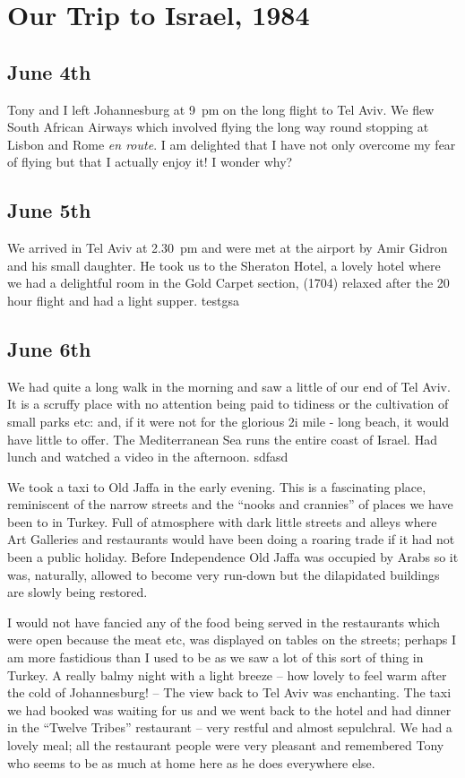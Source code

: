 \chapter{Our Trip to Israel, 1984}\label{Israel}


\section{June 4th}

Tony and I left Johannesburg at 9~pm on the long flight to Tel
Aviv. We flew South African Airways which involved flying the long way
round stopping at Lisbon and Rome \textit{en route}. I am delighted
that I have not only overcome my fear of flying but that I actually
enjoy it! I wonder why?

\section{June 5th}

We arrived in Tel Aviv at 2.30~pm and were met at the airport by Amir
Gidron and his small daughter.  He took us to the Sheraton Hotel, a
lovely hotel where we had a delightful room in the Gold Carpet
section, (1704) relaxed after the 20 hour flight and had a light
supper. testgsa

\section{June 6th}

We had quite a long walk in the morning and saw a little of our end of
Tel Aviv. It is a scruffy place with no attention being paid to
tidiness or the cultivation of small parks etc: and, if it were not
for the glorious 2i mile - long beach, it would have little to
offer. The Mediterranean Sea runs the entire coast of Israel. Had
lunch and watched a video in the afternoon. sdfasd

We took a taxi to Old Jaffa in the early evening. This is a
fascinating place, reminiscent of the narrow streets and the ``nooks
and crannies'' of places we have been to in Turkey. Full of atmosphere
with dark little streets and alleys where Art Galleries and
restaurants would have been doing a roaring trade if it had not been a
public holiday. Before Independence Old Jaffa was occupied by Arabs so
it was, naturally, allowed to become very run-down but the dilapidated
buildings are slowly being restored.

I would not have fancied any of the food being served in the
restaurants which were open because the meat etc, was displayed on
tables on the streets; perhaps I am more fastidious than I used to be
as we saw a lot of this sort of thing in Turkey. A really balmy night
with a light breeze -- how lovely to feel warm after the cold of
Johannesburg! -- The view back to Tel Aviv was enchanting. The taxi we
had booked was waiting for us and we went back to the hotel and had
dinner in the ``Twelve Tribes'' restaurant -- very restful and almost
sepulchral. We had a lovely meal; all the restaurant people were very
pleasant and remembered Tony who seems to be as much at home here as
he does everywhere else.

